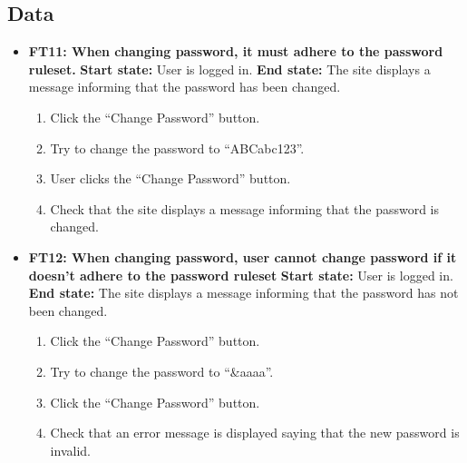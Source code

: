 \documentclass{article}
\begin{document}
\begin{itemize}
	\end{itemize}
	
\subsection{Data}
\begin{itemize}
		\item \textbf{FT11: When changing password, it must adhere to the password ruleset.} \newline
		\textbf{Start state:} User is logged in. \newline
		\textbf{End state:} The site displays a message informing that the password has been changed.
		\begin{enumerate}
			\item Click the “Change Password” button.
			\item Try to change the password to “ABCabc123”.
			\item User clicks the “Change Password” button.
			\item Check that the site displays a message informing that the password is changed.
		\end{enumerate}
		
			\item \textbf{FT12: When changing password, user cannot change password if it doesn't adhere to the password ruleset} \newline
		\textbf{Start state:} User is logged in. \newline
		\textbf{End state:} The site displays a message informing that the password has not been changed.
		\begin{enumerate}
			\item Click the “Change Password” button.
			\item Try to change the password to “\&aaaa”.
			\item Click the “Change Password” button.
			\item Check that an error message is displayed saying that the new password is invalid.
		\end{enumerate}
\end{itemize}
\end{document}
